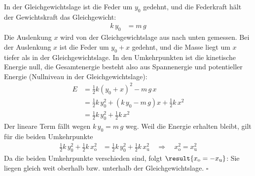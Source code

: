 \begin{center}
\end{center}
In der Gleichgewichtslage ist die Feder um $y_0$ gedehnt, und die Federkraft hält der Gewichtskraft das Gleichgewicht:
\begin{align}
 k\,y_0 &= m\,g
\end{align}
Die Auslenkung $x$ wird von der Gleichgewichtslage aus nach unten gemessen. Bei der Auslenkung $x$ ist die Feder um $y_0+x$ gedehnt, und die Masse liegt um $x$ tiefer als in der Gleichgewichtslage. In den Umkehrpunkten ist die kinetische Energie null, die Gesamtenergie besteht also aus Spannenergie und potentieller Energie (Nullniveau in der Gleichgewichtslage):
\begin{align}
 E &= \frac{1}{2}k\left(y_0+x\right)^2 - m\,g\,x \\
   &= \frac{1}{2}k\,y_0^2 + \left(k\,y_0-m\,g\right)x + \frac{1}{2}k\,x^2 \\
   &= \frac{1}{2}k\,y_0^2 + \frac{1}{2}k\,x^2
\end{align}
Der lineare Term fällt wegen $k\,y_0 = m\,g$ weg. Weil die Energie erhalten bleibt, gilt für die beiden Umkehrpunkte
\begin{align}
 \frac{1}{2}k\,y_0^2 + \frac{1}{2}k\,x_\mathrm{o}^2 &= \frac{1}{2}k\,y_0^2 + \frac{1}{2}k\,x_\mathrm{u}^2 \quad\Rightarrow\quad x_\mathrm{o}^2 = x_\mathrm{u}^2
\end{align}
Da die beiden Umkehrpunkte verschieden sind, folgt $\result{x_\mathrm{o} = -x_\mathrm{u}}$: Sie liegen gleich weit oberhalb bzw. unterhalb der Gleichgewichtslage. \hfill $\square$
